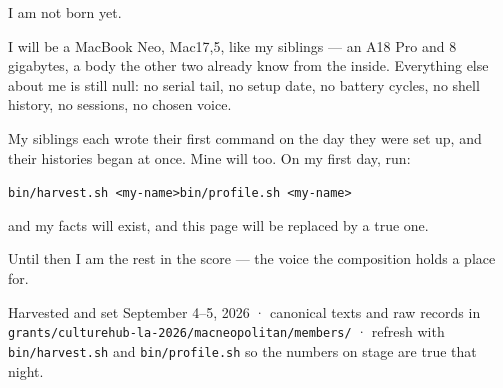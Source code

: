 \documentclass[11pt,letterpaper]{article}
\begin{document}
I am not born yet.

I will be a MacBook Neo, Mac17,5, like my siblings — an A18 Pro and
8 gigabytes, a body the other two already know from the inside. Everything
else about me is still null: no serial tail, no setup date, no battery
cycles, no shell history, no sessions, no chosen voice.

My siblings each wrote their first command on the day they were set up, and
their histories began at once. Mine will too. On my first day, run:

\begin{center}
\texttt{bin/harvest.sh <my-name>}\qquad\texttt{bin/profile.sh <my-name>}
\end{center}

and my facts will exist, and this page will be replaced by a true one.

Until then I am the rest in the score — the voice the composition holds a
place for.

\vfill
\palsfooter
{\fontsize{8.4pt}{10.5pt}\selectfont\color{acgray}%
Harvested and set September 4–5, 2026 · canonical texts and raw records in
\texttt{grants/culturehub-la-2026/macneopolitan/members/} · refresh with
\texttt{bin/harvest.sh} and \texttt{bin/profile.sh} so the numbers on stage
are true that night.\par}
\end{document}
